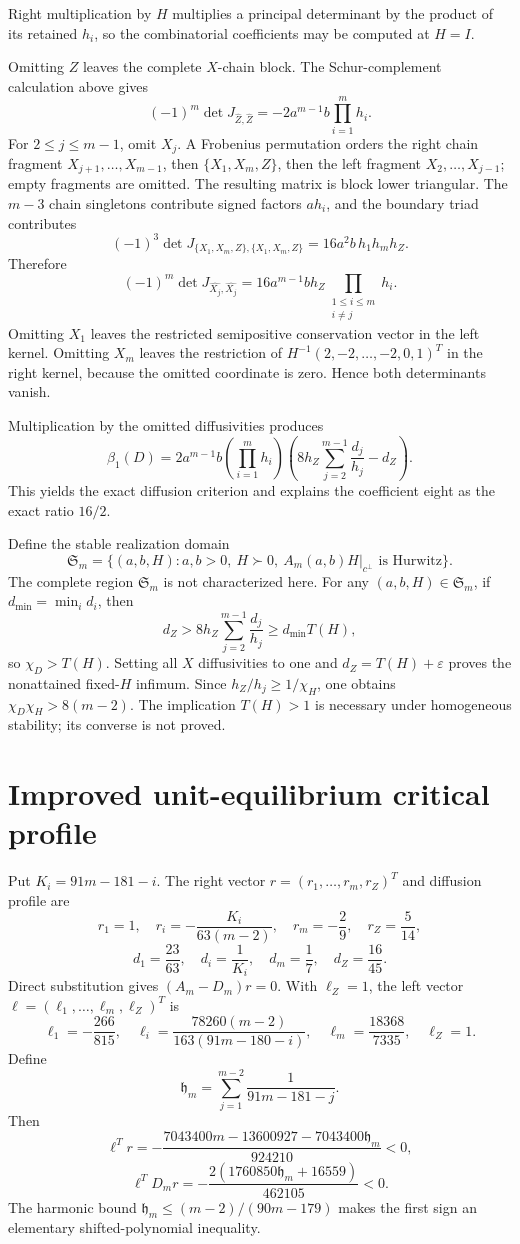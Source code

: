\documentclass[10pt]{article}
\newcommand{\1}{\mathbf1}
\begin{document}
Right multiplication by $H$ multiplies a principal determinant by the product
of its retained $h_i$, so the combinatorial coefficients may be computed at
$H=I$.

Omitting $Z$ leaves the complete $X$-chain block.  The Schur-complement
calculation above gives
\[
 (-1)^m\det J_{\widehat Z,\widehat Z}
 =-2a^{m-1}b\prod_{i=1}^mh_i.
\]
For $2\le j\le m-1$, omit $X_j$.  A Frobenius permutation orders the right
chain fragment $X_{j+1},\ldots,X_{m-1}$, then $\{X_1,X_m,Z\}$, then the left
fragment $X_2,\ldots,X_{j-1}$; empty fragments are omitted.  The resulting
matrix is block lower triangular.  The $m-3$ chain singletons contribute signed
factors $a h_i$, and the boundary triad contributes
\[
 (-1)^3\det J_{\{X_1,X_m,Z\},\{X_1,X_m,Z\}}
 =16a^2b\,h_1h_mh_Z.
\]
Therefore
\[
 (-1)^m\det J_{\widehat{X_j},\widehat{X_j}}
 =16a^{m-1}bh_Z\prod_{\substack{1\le i\le m\\i\ne j}}h_i.
\]
Omitting $X_1$ leaves the restricted semipositive conservation vector in the
left kernel.  Omitting $X_m$ leaves the restriction of
$H^{-1}(2,-2,\ldots,-2,0,1)^T$ in the right kernel, because the omitted
coordinate is zero.  Hence both determinants vanish.

Multiplication by the omitted diffusivities produces
\[
 \beta_1(D)=2a^{m-1}b\left(\prod_{i=1}^mh_i\right)
 \left(8h_Z\sum_{j=2}^{m-1}\frac{d_j}{h_j}-d_Z\right).
\]
This yields the exact diffusion criterion and explains the coefficient eight
as the exact ratio $16/2$.

Define the stable realization domain
\[
 \mathfrak S_m=\{(a,b,H):a,b>0,\ H\succ0,\
 A_m(a,b)H|_{c^\perp}\text{ is Hurwitz}\}.
\]
The complete region $\mathfrak S_m$ is not characterized here.  For any
$(a,b,H)\in\mathfrak S_m$, if $d_{\min}=\min_i d_i$, then
\[
 d_Z>8h_Z\sum_{j=2}^{m-1}\frac{d_j}{h_j}
 \ge d_{\min}T(H),
\]
so $\chi_D>T(H)$.  Setting all $X$ diffusivities to one and
$d_Z=T(H)+\varepsilon$ proves the nonattained fixed-$H$ infimum.  Since
$h_Z/h_j\ge1/\chi_H$, one obtains $\chi_D\chi_H>8(m-2)$.  The implication
$T(H)>1$ is necessary under homogeneous stability; its converse is not proved.

\section{Improved unit-equilibrium critical profile}

Put $K_i=91m-181-i$.  The right vector
$r=(r_1,\ldots,r_m,r_Z)^T$ and diffusion profile are
\[
 r_1=1,\quad r_i=-\frac{K_i}{63(m-2)},\quad
 r_m=-\frac29,\quad r_Z=\frac5{14},
\]
\[
 d_1=\frac{23}{63},\quad d_i=\frac1{K_i},\quad
 d_m=\frac17,\quad d_Z=\frac{16}{45}.
\]
Direct substitution gives $(A_m-D_m)r=0$.  With $\ell_Z=1$, the left vector
$\ell=(\ell_1,\ldots,\ell_m,\ell_Z)^T$ is
\[
 \ell_1=-\frac{266}{815},\quad
 \ell_i=\frac{78260(m-2)}{163(91m-180-i)},\quad
 \ell_m=\frac{18368}{7335},\quad \ell_Z=1.
\]
Define
\[
 \mathfrak h_m=\sum_{j=1}^{m-2}\frac1{91m-181-j}.
\]
Then
\[
 \ell^Tr=-\frac{7043400m-13600927-7043400\mathfrak h_m}{924210}<0,
\]
\[
 \ell^TD_mr=-\frac{2(1760850\mathfrak h_m+16559)}{462105}<0.
\]
The harmonic bound $\mathfrak h_m\le(m-2)/(90m-179)$ makes the first sign an elementary
shifted-polynomial inequality.
\end{document}
